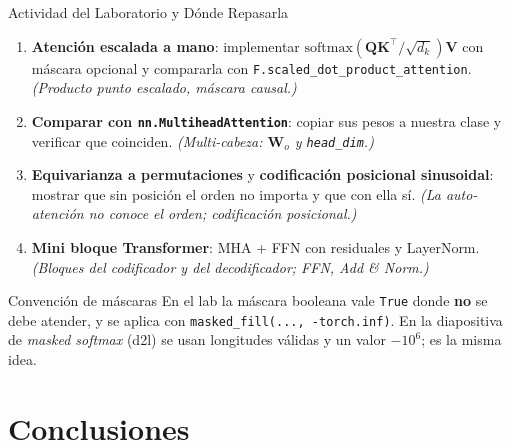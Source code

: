 \documentclass[aspectratio=169, 10pt]{beamer}
\newcommand{\softmax}{\mathrm{softmax}}
\begin{document}
\begin{frame}{Actividad del Laboratorio y D\'onde Repasarla}
	\begin{enumerate}
		\item \textbf{Atenci\'on escalada a mano}: implementar $\softmax(\mathbf{Q}\mathbf{K}^\top/\sqrt{d_k})\mathbf{V}$ con m\'ascara opcional y compararla con \texttt{F.scaled\_dot\_product\_attention}. \emph{(Producto punto escalado, m\'ascara causal.)}
		\item \textbf{Comparar con \texttt{nn.MultiheadAttention}}: copiar sus pesos a nuestra clase y verificar que coinciden. \emph{(Multi-cabeza: $\mathbf{W}_o$ y \texttt{head\_dim}.)}
		\item \textbf{Equivarianza a permutaciones} y \textbf{codificaci\'on posicional sinusoidal}: mostrar que sin posici\'on el orden no importa y que con ella s\'i. \emph{(La auto-atenci\'on no conoce el orden; codificaci\'on posicional.)}
		\item \textbf{Mini bloque Transformer}: MHA + FFN con residuales y LayerNorm. \emph{(Bloques del codificador y del decodificador; FFN, Add \& Norm.)}
	\end{enumerate}
	\begin{alertblock}{Convenci\'on de m\'ascaras}
		\small
		En el lab la m\'ascara booleana vale \texttt{True} donde \textbf{no} se debe atender, y se aplica con \texttt{masked\_fill(..., -torch.inf)}. En la diapositiva de \emph{masked softmax} (d2l) se usan longitudes v\'alidas y un valor $-10^{6}$; es la misma idea.
	\end{alertblock}
\end{frame}

\section{Conclusiones}
\end{document}
